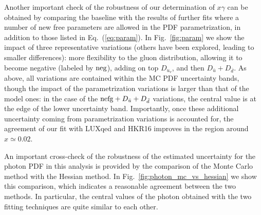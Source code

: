 Another important check of the robustness of our determination of $x\gamma$ can be
obtained by comparing the baseline with the results of further
  fits where a number of new free parameters are allowed
  in the PDF parametrization, in addition to those listed in Eq.~(\ref{eq:param}).
  In Fig.~\ref{fig:param} we show the impact of three representative variations
  (others have been explored, leading to smaller differences):
  more flexibility to the gluon distribution, allowing
  it to become negative (labeled by ${\rm neg}$), adding on top $D_{u_v}$, and then $D_{\bar{u}}+D_{\bar{d}}$.
  As above, all variations are contained within the MC PDF uncertainty bands, though the
  impact of the parametrization variations is larger than that of the model ones:
  in the case of the ${\rm nefg}+D_{\bar{u}}+D_{\bar{d}}$ variations, the central value
  is at the edge of the lower uncertainty band.
  Importantly, once these additional uncertainty coming from parametrization
  variations is accounted for, the agreement of our fit with LUXqed and HKR16 improves
  in the region around $x\simeq 0.02$.


An important cross-check of the robustness of the estimated uncertainty for the photon
PDF in this analysis is provided by the comparison of the Monte Carlo method
with the Hessian method.
%
In Fig.~\ref{fig:photon_mc_vs_hessian} we show this comparison,
which indicates a reasonable agreement between the two methods.
%
In particular, the central values of the photon obtained with the two fitting
techniques are quite similar to each other.

